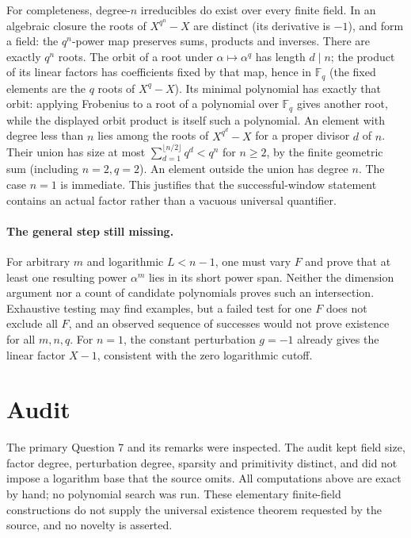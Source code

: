 \documentclass[11pt]{article}
\begin{document}
For completeness, degree-$n$ irreducibles do exist over every finite
field. In an algebraic closure the roots of $X^{q^n}-X$ are distinct
(its derivative is $-1$), and form a field: the $q^n$-power map
preserves sums, products and inverses. There are exactly $q^n$ roots.
The orbit of a root under $\alpha\mapsto\alpha^q$ has length $d\mid n$;
the product of its linear factors has coefficients fixed by that map,
hence in $\mathbb F_q$ (the fixed elements are the $q$ roots of
$X^q-X$). Its minimal polynomial has exactly that orbit: applying
Frobenius to a root of a polynomial over $\mathbb F_q$ gives another
root, while the displayed orbit product is itself such a polynomial.
An element with degree less than $n$ lies among the roots of
$X^{q^d}-X$ for a proper divisor $d$ of $n$. Their union has size at
most $\sum_{d=1}^{\lfloor n/2\rfloor}q^d<q^n$ for $n\ge2$,
by the finite geometric sum (including $n=2,q=2$).
An element outside the union has degree $n$. The case $n=1$ is
immediate. This justifies that the successful-window statement contains
an actual factor rather than a vacuous universal quantifier.

\paragraph{The general step still missing.}
For arbitrary $m$ and logarithmic $L<n-1$, one must vary $F$ and
prove that at least one resulting power $\alpha^m$ lies in its short
power span. Neither the dimension argument nor a count of candidate
polynomials proves such an intersection. Exhaustive testing may find
examples, but a failed test for one $F$ does not exclude all $F$, and
an observed sequence of successes would not prove existence for all
$m,n,q$. For $n=1$, the constant perturbation $g=-1$ already gives
the linear factor $X-1$, consistent with the zero logarithmic cutoff.

\section{Audit}
The primary Question 7 and its remarks were inspected. The audit kept
field size, factor degree, perturbation degree, sparsity and primitivity
distinct, and did not impose a logarithm base that the source omits.
All computations above are exact by hand; no polynomial search was run.
These elementary finite-field constructions do not supply the universal
existence theorem requested by the source, and no novelty is asserted.
\end{document}
